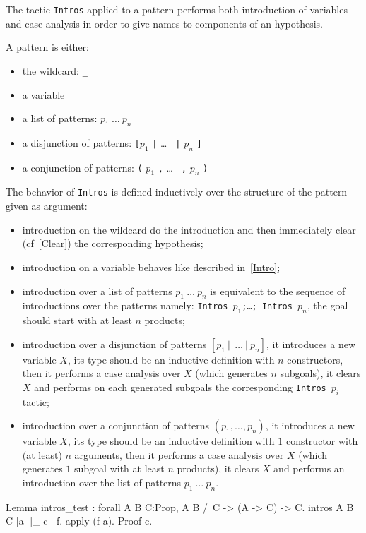 The tactic {\tt Intros} applied to a pattern performs both
introduction of variables and case analysis in order to give names to
components of an hypothesis.

A pattern is either:
\begin{itemize}
\item the wildcard: {\tt \_}
\item a variable
\item a list of patterns: $p_1~\ldots~p_n$
\item a disjunction of patterns: {\tt [}$p_1$ {\tt |} {\ldots} {\tt
|} $p_n$ {\tt ]}
\item a conjunction of patterns: {\tt (} $p_1$ {\tt ,} {\ldots} {\tt
,} $p_n$ {\tt )}
\end{itemize}

The behavior of \texttt{Intros} is defined inductively over the
structure of the pattern given as argument:
\begin{itemize}
\item introduction on the wildcard do the introduction and then
  immediately clear (cf~\ref{Clear}) the corresponding hypothesis;
\item introduction on a variable behaves like described in~\ref{Intro}; 
\item introduction over a
list of patterns $p_1~\ldots~p_n$ is equivalent to the sequence of
introductions over the patterns namely:
\texttt{Intros $p_1$;\ldots; Intros $p_n$}, the goal should start with
at least $n$ products;
\item introduction over a
disjunction of patterns $[p_1~|~~\ldots~|~p_n]$, it 
introduces a new variable $X$, its type should be an inductive
definition with $n$
constructors, then it performs a case analysis over $X$ 
(which generates $n$ subgoals), it 
clears $X$ and performs on each generated subgoals the corresponding
\texttt{Intros}~$p_i$ tactic;
\item introduction over a 
conjunction  of patterns $(p_1,\ldots,p_n)$, it
introduces a new variable $X$, its type should be an inductive 
definition with $1$
constructor with (at least) $n$ arguments, then it performs a case 
analysis over $X$ 
(which generates $1$ subgoal with at least $n$ products), it 
clears $X$ and performs an introduction over the list of patterns $p_1~\ldots~p_n$.
\end{itemize}
\begin{coq_example}
Lemma intros_test : forall A B C:Prop, A \/ B /\ C -> (A -> C) -> C.
intros A B C [a| [_ c]] f.
apply (f a).
Proof c.
\end{coq_example}

